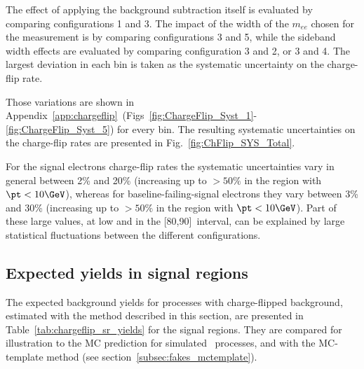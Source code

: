 The effect of applying the background subtraction itself is evaluated by comparing configurations 1 and 3. 
The impact of the width of the $m_{ee}$ chosen for the measurement is  by comparing configurations 3 and 5, 
while the sideband width effects are evaluated by comparing configuration 3 and 2, or 3 and 4. 
The largest deviation in each bin is taken as the systematic uncertainty on the charge-flip rate.

Those variations are shown in Appendix~\ref{app:chargeflip}~(Figs~\ref{fig:ChargeFlip_Syst_1}-\ref{fig:ChargeFlip_Syst_5}) for every bin. The resulting systematic uncertainties on the charge-flip rates are presented in Fig.~\ref{fig:ChFlip_SYS_Total}. 

For the signal electrons charge-flip rates the systematic uncertainties vary in general between 2\% and 20\% (increasing up to $>50\%$ in the region with $\pt < 10 \GeV$), whereas for baseline-failing-signal electrons they vary between 3\% and 30\% (increasing up to $>50\%$ in the region with $\pt < 10 \GeV$). Part of these large values, at low \pt and in the [80,90]~\GeV \pt interval, can be explained by large statistical fluctuations between the different configurations.



\subsection{Expected yields in signal regions}
\label{subsec:chargeflip_yields}

The expected background yields for processes with charge-flipped background, estimated with the method described in this section, 
are presented in Table~\ref{tab:chargeflip_sr_yields} for the signal regions. 
They are compared for illustration to the MC prediction for simulated \ttbar\ processes, and with the MC-template method (see section~\ref{subsec:fakes_mctemplate}). 

